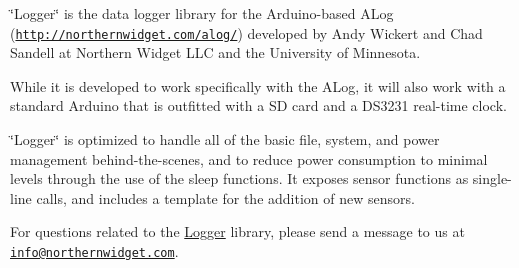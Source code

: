\char`\"{}\+Logger\char`\"{} is the data logger library for the Arduino-\/based A\+Log (\href{http://northernwidget.com/alog/}{\tt http\+://northernwidget.\+com/alog/}) developed by Andy Wickert and Chad Sandell at Northern Widget L\+LC and the University of Minnesota.

While it is developed to work specifically with the A\+Log, it will also work with a standard Arduino that is outfitted with a SD card and a D\+S3231 real-\/time clock.

\char`\"{}\+Logger\char`\"{} is optimized to handle all of the basic file, system, and power management behind-\/the-\/scenes, and to reduce power consumption to minimal levels through the use of the sleep functions. It exposes sensor functions as single-\/line calls, and includes a template for the addition of new sensors.

For questions related to the \hyperlink{classLogger}{Logger} library, please send a message to us at \href{mailto:info@northernwidget.com}{\tt info@northernwidget.\+com}. 